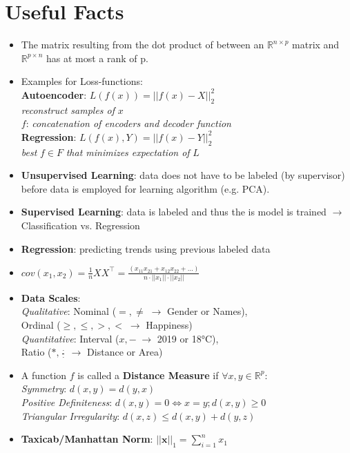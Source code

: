\documentclass[english]{latex4ei/latex4ei_sheet}
\begin{document}
\section{Useful Facts}
\begin{itemize}
    \item The matrix resulting from the dot product of between an $\mathbb{R}^{n \times p}$ matrix and $\mathbb{R}^{p \times n}$ has at most a rank of p.
    \item Examples for Loss-functions:\\
    \textbf{Autoencoder}: $L(f(x))=||f(x)-X||_2^2$\\
    \emph{reconstruct samples of} $x$\\ 
    $f$:\emph{ concatenation of encoders and decoder function}\\
    \textbf{Regression}: $L(f(x), Y)=||f(x)-Y||_2^2$\\
    \emph{best} $f \in F$ \emph{that minimizes expectation of }$L$
    \item \textbf{Unsupervised Learning}: data does not have to be labeled (by supervisor) before data is employed for learning algorithm (e.g. PCA).
    \item \textbf{Supervised Learning}: data is labeled and thus the is model is trained $\rightarrow$ Classification vs. Regression
    \item \textbf{Regression}: predicting trends using previous labeled data
    \item $cov(x_1,x_2)=\frac{1}{n}XX^{\top}=\frac{(x_{11}x_{21}+x_{12}x_{22}+...)}{n\cdot||x_1||\cdot||x_2||}$
    \item \textbf{Data Scales}:\\
    \emph{Qualitative}: Nominal ($=,\neq\;\rightarrow$ Gender or Names), \\Ordinal ($\ge,\le,>,<\;\rightarrow$ Happiness)\\
    \emph{Quantitative}: Interval ($x,-\;\rightarrow$ 2019 or 18°C), \\Ratio ($ * , \frac{\cdot}{\cdot} \;\rightarrow$ Distance or Area)
    \item A function $f$ is called a \textbf{Distance Measure} if $\forall x,y \in \mathbb{R}^p$:\\
    \emph{Symmetry}: $d(x,y)=d(y,x)$\\
    \emph{Positive Definiteness}: $d(x,y)=0 \Leftrightarrow x=y; d(x,y)\ge0$\\
    \emph{Triangular Irregularity}: $d(x,z)\le d(x,y)+d(y,z)$
    \item \textbf{Taxicab/Manhattan Norm}: $||\mathbf{x}||_1=\sum_{i=1}^n{x_1}$\\

\end{itemize}
\end{document}
